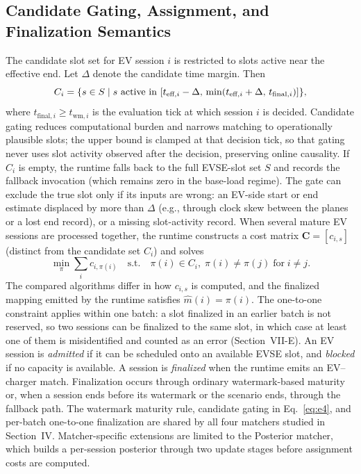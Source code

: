 \documentclass{ieeeaccess}
\newif\ifhighlight \highlightfalse
\DeclareRobustCommand{\revised}[1]{\ifhighlight{\color{blue}#1}\else{\color{.}#1}\fi}
\begin{document}
    \subsection{Candidate Gating, Assignment, and Finalization Semantics}
    The candidate slot set for EV session $i$ is restricted to slots active near the effective end.
    Let $\Delta$ denote the candidate time margin.
    Then
    \begin{equation}\label{eq:e4}
        \revised{C_i = \{ s \in S \mid s \text{ active in } [t_{\text{eff},i} - \Delta,\, \min(t_{\text{eff},i} + \Delta,\, t_{\text{final},i})] \},}
    \end{equation}
    \revised{where $t_{\text{final},i} \geq t_{\text{wm},i}$ is the evaluation tick at which session $i$ is decided.}
    Candidate gating reduces computational burden and narrows matching to operationally plausible slots; the upper bound is clamped \revised{at that decision tick, so that} gating never uses slot activity observed after the decision, preserving online causality.
    If $C_i$ is empty, the runtime falls back to the full EVSE-slot set $S$ and records the fallback invocation (which remains zero in the base-load regime).
    \revised{The gate can exclude the true slot only if its inputs are wrong: an EV-side start or end estimate displaced by more than $\Delta$ (e.g., through clock skew between the planes or a lost end record), or a missing slot-activity record.}
    When several mature EV sessions are processed together, the runtime constructs a cost matrix $\mathbf{C} = [c_{i,s}]$ (distinct from the candidate set $C_i$) and solves
    \begin{equation}\label{eq:e5}
        \min_\pi \sum_i c_{i,\pi(i)} \quad \text{s.t.} \quad \pi(i) \in C_i,\; \pi(i) \neq \pi(j)\;\text{for}\;i \neq j.
    \end{equation}
    The compared algorithms differ in how $c_{i,s}$ is computed, and the finalized mapping emitted by the runtime satisfies $\hat{m}(i) = \pi(i)$. \revised{The one-to-one constraint applies within one batch: a slot finalized in an earlier batch is not reserved, so two sessions can be finalized to the same slot, in which case at least one of them is misidentified and counted as an error (Section~VII-E).}
    An EV session is \textit{admitted} if it can be scheduled onto an available EVSE slot, and \textit{blocked} if no capacity is available.
    A session is \textit{finalized} when the runtime emits an EV--charger match.
    Finalization occurs through ordinary watermark-based maturity or\revised{, when a session ends before its watermark or the scenario ends, through the fallback path}.
    The watermark maturity rule, candidate gating in Eq.~\eqref{eq:e4}, and per-batch one-to-one finalization are shared by all four matchers studied in Section~IV.
    Matcher-specific extensions are limited to the Posterior matcher, which builds a per-session posterior through two update stages before assignment costs are computed.
\end{document}
